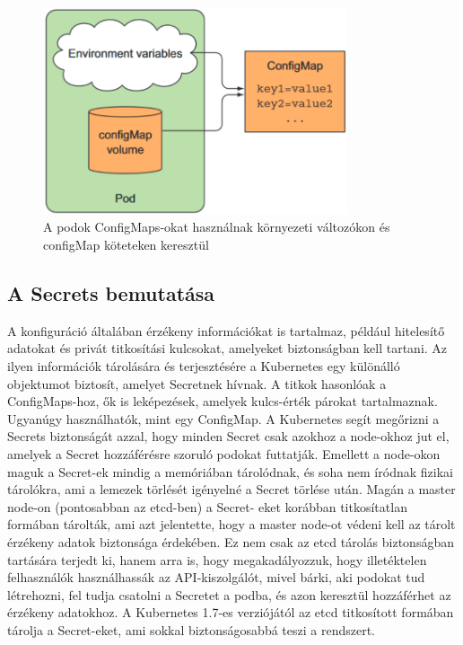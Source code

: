 \begin{figure}[ht]
    \centering
         \includegraphics[width=0.8\textwidth]{figures/kubernetes/configMap.png}
          \caption{A podok ConfigMaps-okat használnak környezeti változókon és configMap köteteken keresztül \cite{Marko17}}
           \label{configMap}
\end{figure}

\subsection{A Secrets bemutatása}
A konfiguráció általában érzékeny információkat is tartalmaz, például hitelesítő adatokat és privát titkosítási kulcsokat, amelyeket biztonságban kell tartani. Az ilyen információk tárolására és terjesztésére a Kubernetes egy különálló objektumot biztosít, amelyet Secretnek hívnak. A titkok hasonlóak a ConfigMaps-hoz, ők is leképezések, amelyek kulcs-érték párokat tartalmaznak. Ugyanúgy használhatók, mint egy ConfigMap. A Kubernetes segít megőrizni a Secrets biztonságát azzal, hogy minden Secret csak azokhoz a node-okhoz jut el, amelyek a Secret hozzáférésre szoruló podokat futtatják. Emellett a node-okon maguk a Secret-ek mindig a memóriában tárolódnak, és soha nem íródnak fizikai tárolókra, ami a lemezek törlését igényelné a Secret törlése után. Magán a master node-on (pontosabban az etcd-ben) a Secret- eket korábban titkosítatlan formában tárolták, ami azt jelentette, hogy a master node-ot védeni kell az tárolt érzékeny adatok biztonsága érdekében. Ez nem csak az etcd tárolás biztonságban tartására terjedt ki, hanem arra is, hogy megakadályozzuk, hogy illetéktelen felhasználók használhassák az API-kiszolgálót, mivel bárki, aki podokat tud létrehozni, fel tudja csatolni a Secretet a podba, és azon keresztül hozzáférhet az érzékeny adatokhoz. A Kubernetes 1.7-es verziójától az etcd titkosított formában tárolja a Secret-eket, ami sokkal biztonságosabbá teszi a rendszert.
\cite{Marko17}

